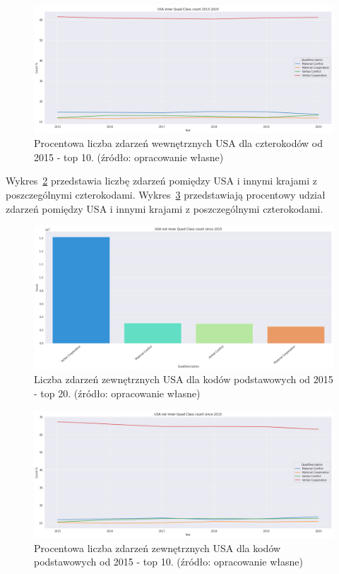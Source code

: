 \documentclass[11pt]{report}
\begin{document}
    \begin{figure}[!htp]
        \centering
        \includegraphics[width=\linewidth]{fig/USA inner/QCperc.png}
        \caption{Procentowa liczba zdarzeń wewnętrznych USA dla czterokodów od 2015 - top 10. (źródło: opracowanie własne)}
        \label{fig:USA_inner_QCperc}
    \end{figure}

    Wykres~\ref{fig:USA_not_inner_QC} przedstawia liczbę zdarzeń pomiędzy USA i innymi krajami z poszczególnymi czterokodami.
    Wykres~\ref{fig:USA_not_inner_QCperc} przedstawiają procentowy udział zdarzeń pomiędzy USA i innymi krajami z poszczególnymi czterokodami.

    \begin{figure}[!htp]
        \centering
        \includegraphics[width=\linewidth]{fig/USA not inner/QC.png}
        \caption{Liczba zdarzeń zewnętrznych USA dla kodów podstawowych od 2015 - top 20. (źródło: opracowanie własne)}
        \label{fig:USA_not_inner_QC}
    \end{figure}

    \begin{figure}[!htp]
        \centering
        \includegraphics[width=\linewidth]{fig/USA not inner/QCperc.png}
        \caption{Procentowa liczba zdarzeń zewnętrznych USA dla kodów podstawowych od 2015 - top 10. (źródło: opracowanie własne)}
        \label{fig:USA_not_inner_QCperc}
    \end{figure}
\end{document}
